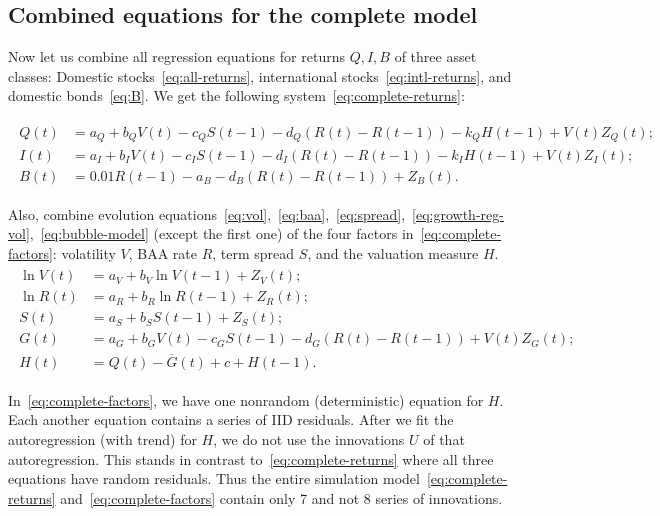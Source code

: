 \documentclass[12pt]{amsart}
\begin{document}
\subsection{Combined equations for the complete model} Now let us combine all regression equations for returns $Q, I, B$ of three asset classes: Domestic stocks~\eqref{eq:all-returns}, international stocks~\eqref{eq:intl-returns}, and domestic bonds~\eqref{eq:B}. We get the following system~\eqref{eq:complete-returns}:

\begin{align}
\label{eq:complete-returns}
\begin{split}
Q(t) &= a_Q + b_QV(t) - c_QS(t-1) - d_Q(R(t) - R(t-1)) - k_QH(t-1) + V(t)Z_Q(t);\\
I(t) &= a_I + b_IV(t) - c_IS(t-1) - d_I(R(t) - R(t-1)) - k_IH(t-1) + V(t)Z_I(t);\\
B(t) &= 0.01R(t-1) - a_B - d_B(R(t) - R(t-1)) + Z_B(t).
\end{split}
\end{align}

Also, combine evolution equations~\eqref{eq:vol},~\eqref{eq:baa},~\eqref{eq:spread},~\eqref{eq:growth-reg-vol},~\eqref{eq:bubble-model} (except the first one) of the four factors in~\eqref{eq:complete-factors}: volatility $V$, BAA rate $R$, term spread $S$, and the valuation measure $H$.
\begin{align}
\label{eq:complete-factors}
\begin{split}
\ln V(t) &= a_V + b_V\ln V(t-1) + Z_V(t);\\
\ln R(t) &= a_R + b_R\ln R(t-1) + Z_R(t);\\
S(t) &= a_S + b_SS(t-1) + Z_S(t);\\
G(t) &= a_G + b_GV(t) - c_GS(t-1) - d_G(R(t) - R(t-1)) + V(t)Z_G(t);\\
H(t) &= Q(t) - \overline{G}(t) + c + H(t-1).
\end{split}
\end{align}

In~\eqref{eq:complete-factors}, we have one nonrandom (deterministic) equation for $H$. Each another equation contains a series of IID residuals. After we fit the autoregression (with trend) for $H$, we do not use the innovations $U$ of that autoregression. This stands in contrast to~\eqref{eq:complete-returns} where all three equations have random residuals. Thus the entire simulation model~\eqref{eq:complete-returns} and~\eqref{eq:complete-factors} contain only 7 and not 8 series of innovations. 
\end{document}
